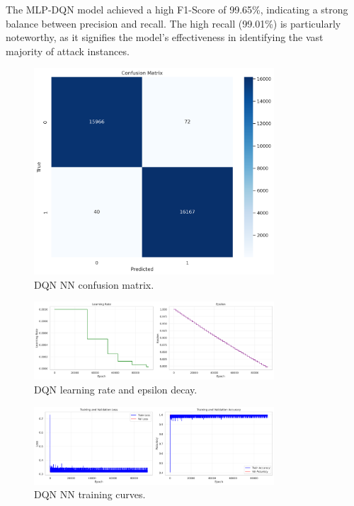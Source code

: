 \documentclass[16pt]{report}
\begin{document}
The MLP-DQN model achieved a high F1-Score of 99.65\%, indicating a strong balance between precision and recall. The high recall (99.01\%) is particularly noteworthy, as it signifies the model's effectiveness in identifying the vast majority of attack instances.
\begin{figure}[htbp]
    \centering
    \includegraphics[width=0.8\textwidth]{images/dqn_nn_confusion_matrix.png}
    \caption{DQN NN confusion matrix.}
    \label{fig:dqn_confusion}
\end{figure}

\vspace{0.5cm}

\begin{figure}[htbp]
    \centering
    \includegraphics[width=0.8\textwidth]{images/dqn_nn_lr_epsilon.png}
    \caption{DQN learning rate and epsilon decay.}
    \label{fig:dqn_lr_epsilon}
\end{figure}

\vspace{0.5cm}

\begin{figure}[htbp]
    \centering
    \includegraphics[width=0.8\textwidth]{images/dqn_nn_training_curves.png}
    \caption{DQN NN training curves.}
    \label{fig:dqn_training_curves}
\end{figure}
\end{document}
